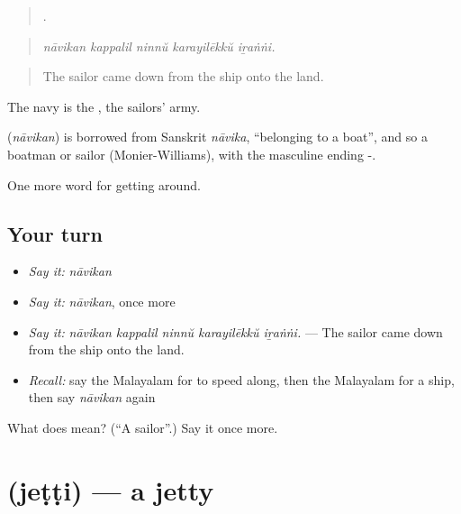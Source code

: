 \begin{quote}
    .
\end{quote}

\begin{quote}
\emph{nāvikan kappalil ninnŭ karayilēkkŭ iṟaṅṅi.}
\end{quote}

\begin{quote}
The sailor came down from the ship onto the land.
\end{quote}

The navy is the , the sailors' army.

\begin{cousinweb}
\textbf{} (\emph{nāvikan}) is borrowed from Sanskrit \emph{nāvika}, \textquotedblleft{}belonging to a boat\textquotedblright{}, and so a boatman or sailor (Monier-Williams), with the masculine ending -.
\end{cousinweb}

\begin{grammarlens}[title={What you've built}]
One more word for getting around.
\end{grammarlens}

\subsection*{Your turn}
\begin{itemize}
\raggedright
  \item \emph{Say it:} \emph{nāvikan}
  \item \emph{Say it:} \emph{nāvikan}, once more
  \item \emph{Say it:} \emph{nāvikan kappalil ninnŭ karayilēkkŭ iṟaṅṅi.} — The sailor came down from the ship onto the land.
  \item \emph{Recall:} say the Malayalam for to speed along, then the Malayalam for a ship, then say \emph{nāvikan} again
\end{itemize}

\begin{tcolorbox}[breakable,colback=teal!4,colframe=teal!35!black,title={Before you move on}]
What does  mean? (\textquotedblleft{}A sailor\textquotedblright{}.) Say it once more.
\end{tcolorbox}
\section[\texorpdfstring{\ml{ജെട്ടി} (jeṭṭi)}{ജെട്ടി (jeṭṭi)}]{ (jeṭṭi) — a jetty}

